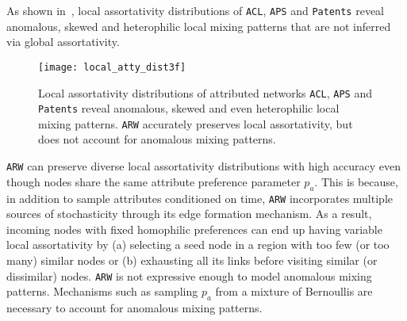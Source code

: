 As shown in~, local assortativity distributions
of \texttt{ACL}, \texttt{APS} and \texttt{Patents} reveal anomalous, skewed
and heterophilic local mixing patterns that are not inferred via global assortativity.

\begin{figure}[h]
	\centering
	\vspace{-9pt}
	\texttt{[image: local\_atty\_dist3f]}
	\caption{Local assortativity distributions of attributed networks \texttt{ACL}, \texttt{APS}
		and \texttt{Patents} reveal anomalous, skewed and even heterophilic local mixing patterns.
		\texttt{ARW} accurately preserves local assortativity, but does not account for anomalous mixing patterns.}
	\label{fig:local_atty}
	\vspace{-8pt}
\end{figure}

\texttt{ARW} can preserve
diverse local assortativity distributions with high accuracy even though nodes
share the same attribute preference parameter $p_a$. This is because, in addition
to sample attributes conditioned on time, \texttt{ARW}
incorporates multiple sources of stochasticity through its edge formation
mechanism. As a result, incoming nodes with fixed homophilic preferences can end
up having variable local assortativity by (a) selecting a seed node in a region
with too few (or too many) similar nodes or (b) exhausting all its links before
visiting similar (or dissimilar) nodes.
\texttt{ARW} is not expressive enough to model anomalous
mixing patterns. Mechanisms such as sampling $p_a$ from a mixture of
Bernoullis are necessary to account for anomalous mixing patterns.
